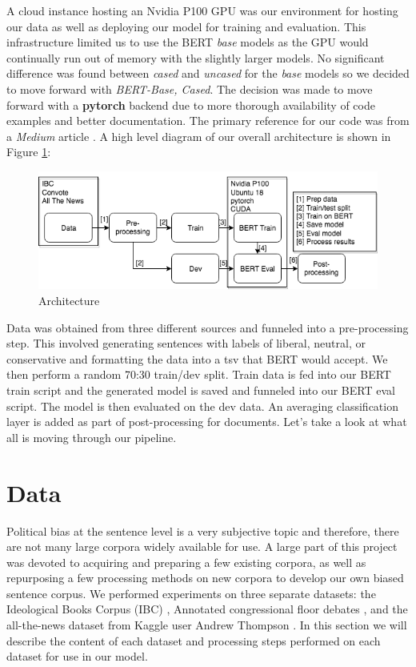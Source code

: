 \documentclass[10pt,a4paper,onecolumn]{article}
\begin{document}
A cloud instance hosting an Nvidia P100 GPU was our environment for hosting our data as well as deploying our model for training and evaluation. This infrastructure limited us to use the BERT \textit{base} models as the GPU would continually run out of memory with the slightly larger models. No significant difference was found between \textit{cased} and \textit{uncased} for the \textit{base} models so we decided to move forward with \textit{BERT-Base, Cased}. The decision was made to move forward with a \textbf{pytorch} backend due to more thorough availability of code examples and better documentation. The primary reference for our code was from a \textit{Medium} article \cite{usingbert}. A high level diagram of our overall architecture is shown in Figure \ref{fig:architecture}:
\begin{figure}[h]
	\begin{center}
		\includegraphics[width=0.8\linewidth]{architecture.png}
		\caption{Architecture}
		\label{fig:architecture}
	\end{center}
\end{figure}
Data was obtained from three different sources and funneled into a pre-processing step. This involved generating sentences with labels of liberal, neutral, or conservative and formatting the data into a tsv that BERT would accept. We then perform a random 70:30 train/dev split. Train data is fed into our BERT train script and the generated model is saved and funneled into our BERT eval script. The model is then evaluated on the dev data. An averaging classification layer is added as part of post-processing for documents. Let's take a look at what all is moving through our pipeline. 

\section{Data}
\label{sec:data}
Political bias at the sentence level is a very subjective topic and therefore, there are not many large corpora widely available for use. A large part of this project was devoted to acquiring and preparing a few existing corpora, as well as repurposing a few processing methods on new corpora to develop our own biased sentence corpus. We performed experiments on three separate datasets: the Ideological Books Corpus (IBC) \cite{iyyerRNN}, Annotated congressional floor debates \cite{convote}, and the all-the-news dataset from Kaggle user Andrew Thompson \cite{news}. In this section we will describe the content of each dataset and processing steps performed on each dataset for use in our model.
\end{document}
